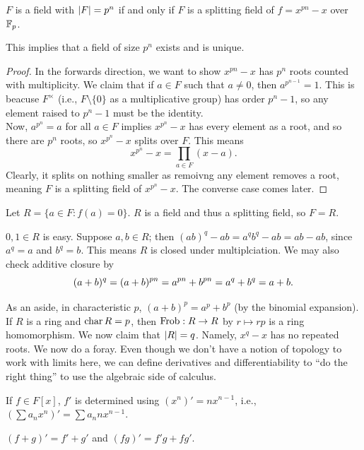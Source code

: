 \begin{theorem}
    $F$ is a field with $\left\lvert F \right\rvert = p^n$ if and only if $F$ is a splitting field of $f = x^{pn} - x$ over $\mathbb F_p$.
\end{theorem}
This implies that a field of size $p^n$ exists and is unique.
\begin{proof}
    In the forwards direction, we want to show $x^{pn} - x$ has $p^n$ roots counted with multiplicity. We claim that if $a \in F$ such that $a \neq 0$, then $a^{p^{n-1}} = 1$. This is beacuse $F^\times$ (i.e., $F \setminus \{0\}$ as a multiplicative group) has order $p^n - 1$, so any element raised to $p^n - 1$ must be the identity.
    \\[8pt]
    Now, $a^{p^n} = a$ for all $a \in F$ implies $x^{p^n} - x$ has every element as a root, and so there are $p^n$ roots, so $x^{p^n} - x$ splits over $F$. This means
    \[ x^{p^n} - x = \prod_{a \in F} (x - a). \]
    Clearly, it splits on nothing smaller as remoivng any element removes a root, meaning $F$ is a splitting field of $x^{p^n} - x$. The converse case comes later.
\end{proof}
\begin{claim}
    Let $R = \{a \in F : f(a) = 0\}$. $R$ is a field and thus a splitting field, so $F = R$.
\end{claim}
\begin{subproof}
    $0, 1 \in R$ is easy. Suppose $a, b \in R$; then $(ab)^q - ab = a^q b^q - ab = ab - ab$, since $a^q = a$ and $b^q = b$. This means $R$ is closed under multiplciation. We may also check additive closure by
    \[ (a + b)^q = (a + b)^{pn} = a^{pn} + b^{pn} = a^q + b^q = a+b. \qedhere \]
\end{subproof}
As an aside, in characteristic $p$, $(a + b)^p = a^p + b^p$ (by the binomial expansion). If $R$ is a ring and $\operatorname{char} R = p$, then $\operatorname{Frob} : R \to R$ by $r \mapsto rp$ is a ring homomorphism. We now claim that $\left\lvert R \right\rvert = q$. Namely, $x^q - x$ has no repeated roots. We now do a foray. Even though we don't have a notion of topology to work with limits here, we can define derivatives and differentiability to ``do the right thing'' to use the algebraic side of calculus. \vspace{-12pt}
\begin{definition}
    If $f \in F[x]$, $f'$ is determined using $(x^n)' = n x^{n-1}$, i.e., $(\sum a_n x^n)' = \sum a_n n x^{n-1}$.
\end{definition}
\begin{claim}
    $(f + g)' = f' + g'$ and $(fg)' = f'g + fg'$.
\end{claim}
